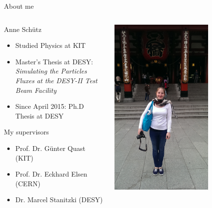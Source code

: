 \documentclass[xcolor={dvipsnames}]{beamer}
\begin{document}
\begin{frame}{About me}
\begin{columns}
\begin{column}[T]{0.6\textwidth}
Anne Sch\"utz\\
\begin{itemize}
\item Studied Physics at KIT
\item Master's Thesis at DESY: \\ \textit{Simulating the Particles Fluxes at the DESY-II Test Beam Facility}
\item Since April 2015: Ph.D Thesis at DESY
\end{itemize}
\vspace*{0.7cm}
My supervisors\\
\begin{itemize}
\item Prof. Dr. G\"unter Quast (KIT)
\item Prof. Dr. Eckhard Elsen (CERN)
\item Dr. Marcel Stanitzki (DESY)
\end{itemize}
\end{column}

\begin{column}[T]{0.35\textwidth}
\vspace{0pt}%
\centering
	\includegraphics[width=0.7\textwidth]{figures/Myself_inJapan.jpg}
\end{column}
\end{columns}

\end{frame}
\end{document}
